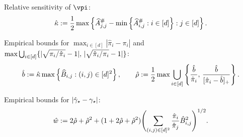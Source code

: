 \begin{algorithm}
\begin{algorithmic}[1]

  \STATE Relative sensitivity of $\vpi$:
  \begin{equation}
    \hat\kappa :=
    \frac12
    \max
    \left\{
      \widehat{A}_{j,j}^\# - \min\left\{ \widehat{A}_{i,j}^\# : i \in [d] \right\}
      : j \in [d]
    \right\} 
    .
    \notag
  \end{equation}
  \label{step:sens}

  \STATE Empirical bounds for $\max_{i \in [d]} |\hat{\pi}_i -
  \pi_i|$ and
  $\max\bigcup_{i\in[d]}
  \{
    |\sqrt{\pi_i/\hat\pi_i}-1|,\,
    |\sqrt{\hat\pi_i/\pi_i}-1|
  \}$:
  \begin{equation}
    \hat{b} := \hat\kappa \max\left\{
      \widehat{B}_{i,j}
      : (i,j) \in [d]^2
    \right\}
    , \qquad
    \hat\rho := \frac12 \max \bigcup_{i\in[d]}
    \left\{
      \frac{\hat{b}}{\hat\pi_i},\,
      \frac{\hat{b}}{[\hat\pi_i-\hat{b}]_+}
    \right\}
    .
    \notag
  \end{equation}
  \label{step:pi-bound}

  \STATE Empirical bounds for $|\hat\gamma_{\star}-\gamma_{\star}|$:
  \begin{equation}
    \hat{w} := 2\hat\rho + \hat\rho^2
    + (1+2\hat\rho+\hat\rho^2)
    \Biggl(
      \sum_{(i,j)\in[d]^2} \frac{\hat\pi_i}{\hat\pi_j} \hat{B}_{i,j}^2
    \Biggr)^{1/2} .
    \notag
  \end{equation}
  \label{step:gap-bound}


\end{algorithmic}
\end{algorithm}

